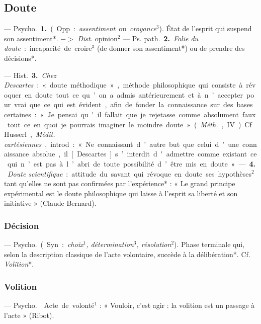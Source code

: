 \subsection{Doute}
 — \si{Psycho.} {\bf 1.} (Opp. :
{\it assentiment} ou {\it croyance}$^3$). État de l'esprit
qui suspend son assentiment*.
$->$ {\it Dist.} opinion$^2$ — \si{Ps. path.}
 {\bf 2.} {\it Folie du doute} : incapacité de
croire$^3$ (de donner son assentiment*)
ou de prendre des décisions*.

— \si{Hist.} {\bf 3.} {\it Chez Descartes} : « doute
méthodique », méthode philosophique qui consiste à révoquer en
doute tout ce qu’on a admis antérieurement et à n’accepter pour vrai
que ce qui est évident, afin de fonder
la connaissance sur des bases certaines : « Je pensai qu'il fallait que
je rejetasse comme absolument faux
tout ce en quoi je pourrais imaginer
le moindre doute » ({\it Méth.}, IV). Cf.
Husserl, {\it Médit. cartésiennes}, introd. :
« Ne connaissant d’autre but que
celui d’une connaissance absolue,
il [Descartes] s’interdit d'admettre
comme existant ce qui n’est pas à
l’abri de toute possibilité d’être mis
en doute ». — {\bf 4.} {\it Doute scientifique} :
attitude du savant qui révoque en
doute ses hypothèses$^2$ tant qu’elles
ne sont pas confirmées par l’expérience* : « Le grand principe expérimental est le doute philosophique
qui laisse à l’esprit sa liberté et son
initiative » (Claude Bernard).

\subsubsection{Décision}
 — \si{Psycho.} (Syn. : {\it choix$^1$,
détermination$^3$, résolution}$^2$). Phase
terminale qui, selon la description
classique de l’acte volontaire, succède à la délibération*. Cf. {\it Volition}*.

\subsubsection{Volition}
 — \si{Psycho.}  Acte de volonté$^1$ : « Vouloir,
c’est agir : la volition est un passage à l'acte » (Ribot).

